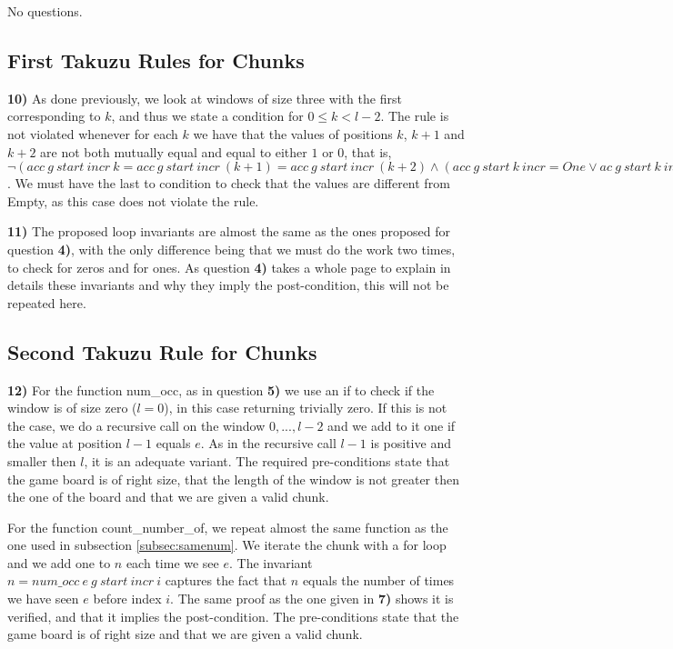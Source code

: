 \documentclass[]{StandardTemplate}
\begin{document}
No questions.

\subsection{First Takuzu Rules for Chunks}
\label{subsec:first}

\textbf{10)} As done previously, we look at windows of size three with the first corresponding to $ k $, and thus we state a condition for $ 0 \leq k < l-2 $. The rule is not violated whenever for each $ k $ we have that the values of positions $ k $, $ k+1 $ and $ k+2 $ are not both mutually equal and equal to either $ 1 $ or $ 0 $, that is, $  \neg ( acc~g~start~incr~k = acc~g~start~incr~(k + 1) = acc~g~start~incr~(k + 2) \land (acc~g~start~k~incr = One \lor ac~ g~start~k~incr = Zero) )  $. We must have the last to condition to check that the values are different from Empty, as this case does not violate the rule.

\textbf{11)} The proposed loop invariants are almost the same as the ones proposed for question \textbf{4)}, with the only difference being that we must do the work two times, to check for zeros and for ones. As question \textbf{4)} takes a whole page to explain in details these invariants and why they imply the post-condition, this will not be repeated here. 

\subsection{Second Takuzu Rule for Chunks}
\label{subsec:second}

\textbf{12)} For the function num\_occ, as in question \textbf{5)} we use an if to check if the window is of size zero ($ l=0 $), in this case returning trivially zero. If this is not the case, we do a recursive call on the window $ 0,...,l-2 $ and we add to it one if the value at position $ l - 1 $ equals $ e$. As in the recursive call $ l-1 $ is positive and smaller then $ l $, it is an adequate variant. The required pre-conditions state that the game board is of right size, that the length of the window is not greater then the one of the board and that we are given a valid chunk.

For the function count\_number\_of, we repeat almost the same function as the one used in subsection \ref{subsec:samenum}. We iterate the chunk with a for loop and we add one to $ n $ each time we see $ e $. The invariant $ n =num\_occ~e~g~start~incr~i$ captures the fact that $ n $ equals the number of times we have seen $ e $ before index $ i $. The same proof as the one given in \textbf{7)} shows it is verified, and that it implies the post-condition. The pre-conditions state that the game board is of right size and that we are given a valid chunk.
\end{document}

